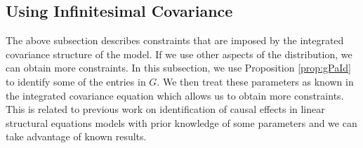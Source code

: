 \documentclass[accepted]{uai2021} %
\begin{document}
\subsection{Using Infinitesimal Covariance}

The above subsection describes constraints that are imposed by the integrated 
covariance structure of the model. If we use other aspects of the distribution, 
we can obtain more constraints. In this subsection, we use Proposition 
\ref{prop:gPaId} to identify some of the entries in $G$. We then treat these 
parameters as known in the integrated covariance equation which allows us to 
obtain more constraints. This is related to previous work on identification of 
causal effects in linear structural equations models with prior knowledge of 
some parameters and we can take advantage of known results.
\end{document}
